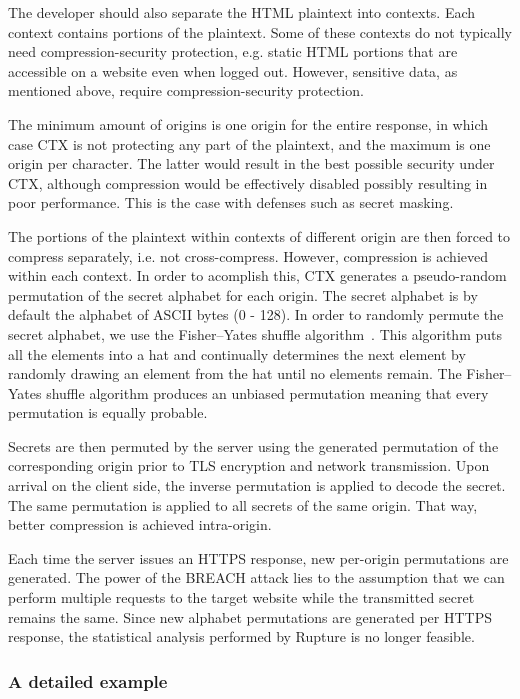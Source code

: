 \documentclass[conference, letterpaper, 10pt]{IEEEtran}
\begin{document}
The developer should also separate the HTML plaintext into contexts. Each
context contains portions of the plaintext. Some of these contexts do not
typically need compression-security protection, e.g. static HTML portions that
are accessible on a website even when logged out. However, sensitive data, as
mentioned above, require compression-security protection.

The minimum amount of origins is one origin for the entire response, in which
case CTX is not protecting any part of the plaintext, and the maximum is one
origin per character. The latter would result in the best possible security
under CTX, although compression would be effectively disabled possibly resulting
in poor performance. This is the case with defenses such as secret masking.

The portions of the plaintext within contexts of different origin are then
forced to compress separately, i.e. not cross-compress. However, compression is
achieved within each context. In order to acomplish this, CTX generates a
pseudo-random permutation of the secret alphabet for each origin. The secret
alphabet is by default the alphabet of ASCII bytes (0 - 128). In order to
randomly permute the secret alphabet, we use the Fisher--Yates shuffle
algorithm~\cite{c17}. This algorithm puts all the elements into a hat and
continually determines the next element by randomly drawing an element from the
hat until no elements remain. The Fisher--Yates shuffle algorithm produces an
unbiased permutation meaning that every permutation is equally probable.

Secrets are then permuted by the server using the generated permutation of the
corresponding origin prior to TLS encryption and network transmission. Upon
arrival on the client side, the inverse permutation is applied to decode the
secret. The same permutation is applied to all secrets of the same origin. That
way, better compression is achieved intra-origin.

Each time the server issues an HTTPS response, new per-origin permutations are
generated. The power of the BREACH attack lies to the assumption that we can
perform multiple requests to the target website while the transmitted secret
remains the same. Since new alphabet permutations are generated per HTTPS
response, the statistical analysis performed by Rupture is no longer feasible.

\subsubsection{A detailed example}
\end{document}
